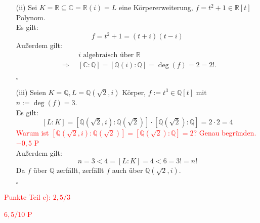 \documentclass[12pt]{article}
\newcommand{\corr}[1]{\textcolor{red}{#1}}
\newcommand{\QED}{\begin{flushright} $\square$ \end{flushright}}
\newcommand{\df}{\enspace\Longrightarrow\enspace}
\newcommand{\grad}{\operatorname{deg}}
\begin{document}
\begin{enumerate}
\begin{enumerate}
		\item[(ii)] Sei $K=\mathbb{R}\subseteq\mathbb{C}=\mathbb{R}(i)=L$ eine Körpererweiterung, $f=t^2+1\in\mathbb{R}[t]$ Polynom. \\
		Es gilt: $$f=t^2+1=(t+i)(t-i)$$
		Außerdem gilt:
		\begin{align*}
			&i\text{ algebraisch über }\mathbb{R} \\
			\df &[\mathbb{C}:\mathbb{Q}]=[\mathbb{Q}(i):\mathbb{Q}]=\grad(f)=2=2!.
		\end{align*}
		\QED
		
		\item[(iii)] Seien $K=\mathbb{Q}, L=\mathbb{Q}(\sqrt{2},i)$ Körper, $f:=t^3\in\mathbb{Q}[t]$ mit $n:=\grad(f)=3$. \\
		Es gilt:
		$$[L:K]=[\mathbb{Q}(\sqrt{2},i):\mathbb{Q}(\sqrt{2})]\cdot[\mathbb{Q}(\sqrt{2}):\mathbb{Q}]=2\cdot2=4$$
\corr{Warum ist $[\mathbb{Q}(\sqrt{2},i):\mathbb{Q}(\sqrt{2})]=[\mathbb{Q}(\sqrt{2}):\mathbb{Q}]=2$? Genau begründen. $-0,5$ P}\\
		Außerdem gilt:
		$$n=3<4=[L:K]=4<6=3!=n!$$
		Da $f$ über $\mathbb{Q}$ zerfällt, zerfällt $f$ auch über $\mathbb{Q}(\sqrt{2},i)$.
		\QED
	\end{enumerate}
\corr{Punkte Teil c): $2,5/3$}
\end{enumerate}
\corr{$6,5/10$ P}
\end{document}

